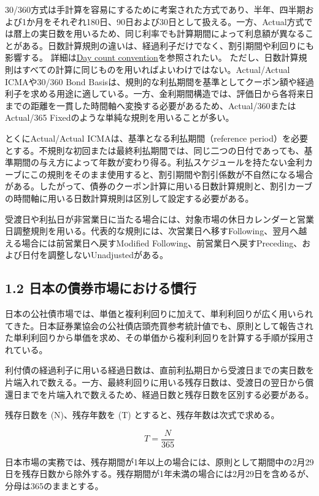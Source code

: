 \documentclass[
  letterpaper,
  DIV=11,
  numbers=noendperiod]{scrreprt}
\begin{document}
30/360方式は手計算を容易にするために考案された方式であり、半年、四半期および1か月をそれぞれ180日、90日および30日として扱える。一方、Actual方式では暦上の実日数を用いるため、同じ利率でも計算期間によって利息額が異なることがある。日数計算規則の違いは、経過利子だけでなく、割引期間や利回りにも影響する。
詳細は\href{https://en.wikipedia.org/wiki/Day_count_convention}{Day
count convention}を参照されたい。
ただし、日数計算規則はすべての計算に同じものを用いればよいわけではない。Actual/Actual
ICMAや30/360 Bond
Basisは、規則的な利払期間を基準としてクーポン額や経過利子を求める用途に適している。一方、金利期間構造では、評価日から各将来日までの距離を一貫した時間軸へ変換する必要があるため、Actual/360またはActual/365
Fixedのような単純な規則を用いることが多い。

とくにActual/Actual ICMAは、基準となる利払期間（reference
period）を必要とする。不規則な初回または最終利払期間では、同じ二つの日付であっても、基準期間の与え方によって年数が変わり得る。利払スケジュールを持たない金利カーブにこの規則をそのまま使用すると、割引期間や割引係数が不自然になる場合がある。したがって、債券のクーポン計算に用いる日数計算規則と、割引カーブの時間軸に用いる日数計算規則は区別して設定する必要がある。

受渡日や利払日が非営業日に当たる場合には、対象市場の休日カレンダーと営業日調整規則を用いる。代表的な規則には、次営業日へ移すFollowing、翌月へ越える場合には前営業日へ戻すModified
Following、前営業日へ戻すPreceding、および日付を調整しないUnadjustedがある。

\subsection{1.2
日本の債券市場における慣行}\label{ux65e5ux672cux306eux50b5ux5238ux5e02ux5834ux306bux304aux3051ux308bux6163ux884c}

日本の公社債市場では、単価と複利利回りに加えて、単利利回りが広く用いられてきた。日本証券業協会の公社債店頭売買参考統計値でも、原則として報告された単利利回りから単価を求め、その単価から複利利回りを計算する手順が採用されている。

利付債の経過利子に用いる経過日数は、直前利払期日から受渡日までの実日数を片端入れで数える。一方、最終利回りに用いる残存日数は、受渡日の翌日から償還日までを片端入れで数えるため、経過日数と残存日数を区別する必要がある。

残存日数を (N)、残存年数を (T) とすると、残存年数は次式で求める。

\[
T=\frac{N}{365}
\]

日本市場の実務では、残存期間が1年以上の場合には、原則として期間中の2月29日を残存日数から除外する。残存期間が1年未満の場合には2月29日を含めるが、分母は365のままとする。
\end{document}
